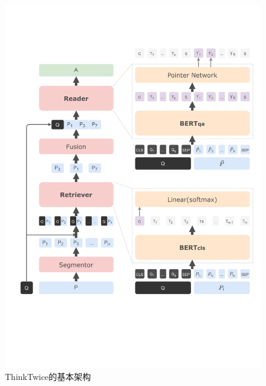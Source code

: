 \begin{figure}[htbp]
    \centering
        \includegraphics[scale=0.6]{figure/3-1.pdf}
    \caption{ThinkTwice的基本架构}
    \label{fig:3-1}
\end{figure}
